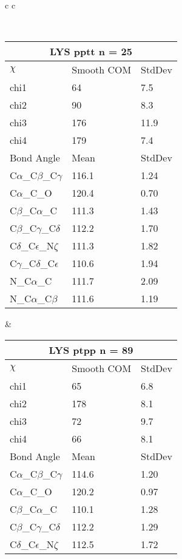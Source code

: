 \newpage

\begin{longtable}{ c c }

\caption{LYS Central Values}\\
  \begin{tabular}{ l l l }
  \toprule
  \multicolumn{3}{c}{LYS \textbf{pptt} n = 25} \\ \toprule
  $\chi$       & Smooth COM & StdDev \\ \midrule
  chi1 & 64 & 7.5 \\ 
  chi2 & 90 & 8.3 \\ 
  chi3 & 176 & 11.9 \\ 
  chi4 & 179 & 7.4 \\ \midrule
  Bond Angle   & Mean     & StdDev \\ \midrule
  C$\alpha$\_C$\beta$\_C$\gamma$ & 116.1 & 1.24\\
  C$\alpha$\_C\_O & 120.4 & 0.70\\
  C$\beta$\_C$\alpha$\_C & 111.3 & 1.43\\
  C$\beta$\_C$\gamma$\_C$\delta$ & 112.2 & 1.70\\
  C$\delta$\_C$\epsilon$\_N$\zeta$ & 111.3 & 1.82\\
  C$\gamma$\_C$\delta$\_C$\epsilon$ & 110.6 & 1.94\\
  N\_C$\alpha$\_C & 111.7 & 2.09\\
  N\_C$\alpha$\_C$\beta$ & 111.6 & 1.19\\
  \bottomrule
  \end{tabular}
  &
  \begin{tabular}{ l l l }
  \toprule
  \multicolumn{3}{c}{LYS \textbf{ptpp} n = 89} \\ \toprule
  $\chi$       & Smooth COM & StdDev \\ \midrule
  chi1 & 65 & 6.8 \\ 
  chi2 & 178 & 8.1 \\ 
  chi3 & 72 & 9.7 \\ 
  chi4 & 66 & 8.1 \\ \midrule
  Bond Angle   & Mean     & StdDev \\ \midrule
  C$\alpha$\_C$\beta$\_C$\gamma$ & 114.6 & 1.20\\
  C$\alpha$\_C\_O & 120.2 & 0.97\\
  C$\beta$\_C$\alpha$\_C & 110.1 & 1.28\\
  C$\beta$\_C$\gamma$\_C$\delta$ & 112.2 & 1.29\\
  C$\delta$\_C$\epsilon$\_N$\zeta$ & 112.5 & 1.72\\

\end{tabular}
\end{longtable}

